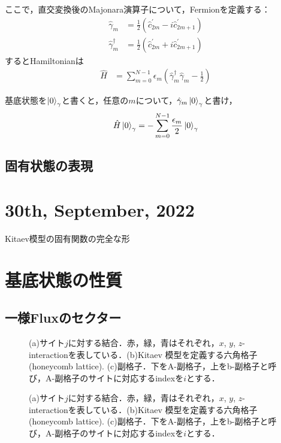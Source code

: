 \documentclass[dvipdfmx,autodetect-engine]{jsarticle}
\begin{document}
ここで，直交変換後のMajonara演算子について，Fermionを定義する：
\begin{align}\label{Fermion}
    \hat{\gamma}_m &= \frac{1}{2}
    (\hat{c}_{2m}^{\prime} - i\hat{c}_{2m+1}^{\prime})\\[10pt]
    \hat{\gamma}_m^{\dagger} &= \frac{1}{2}
    (\hat{c}_{2m}^{\prime} + i\hat{c}_{2m+1}^{\prime})
\end{align}
するとHamiltonianは
\begin{align}
    \hat{H}&=\sum_{m=0}^{N-1}
    \epsilon_m\left(\hat{\gamma}_m^{\dagger}\hat{\gamma}_m-\frac{1}{2}\right)
\end{align}

基底状態を$\ket{0}_{\gamma}$と書くと，任意の$m$について，$\hat{\gamma}_m\ket{0}_{\gamma}$と書け，
\begin{equation}
    \hat{H}\ket{0}_{\gamma} = -\sum_{m=0}^{N-1}\frac{\epsilon_m}{2}\ket{0}_{\gamma}
\end{equation}





\subsection{固有状態の表現}


\section*{30th, September, 2022}
Kitaev模型の固有関数の完全な形


\section{基底状態の性質}

\subsection{一様Fluxのセクター}
\begin{figure}[h]
\centering
\caption{(a)サイト$j$に対する結合．赤，緑，青はそれぞれ，$x$, $y$, $z$-interactionを表している．(b)Kitaev 模型を定義する六角格子 (honeycomb lattice).
(c)副格子．下をA-副格子，上をb-副格子と呼び，A-副格子のサイトに対応するindexを$i$とする．}
\label{fig:schematic1}
\end{figure}\begin{figure}[h]
\centering
\caption{(a)サイト$j$に対する結合．赤，緑，青はそれぞれ，$x$, $y$, $z$-interactionを表している．(b)Kitaev 模型を定義する六角格子 (honeycomb lattice).
(c)副格子．下をA-副格子，上をb-副格子と呼び，A-副格子のサイトに対応するindexを$i$とする．}
\label{fig:schematic1}
\end{figure}
\end{document}
